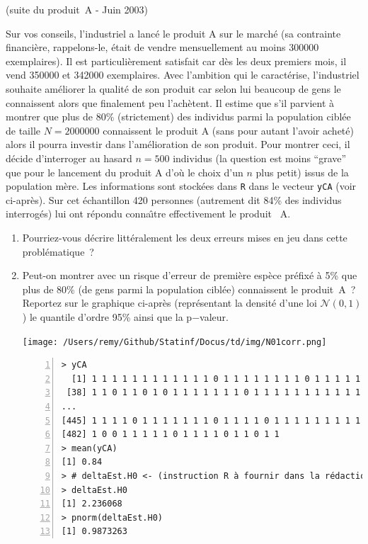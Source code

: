 \documentclass[10pt]{report}
\begin{document}
\begin{exercice} (suite du produit~A - Juin 2003)

Sur vos conseils, l'industriel a lanc{\'e} le produit A sur le march{\'e} (sa contrainte financi{\`e}re, rappelons-le, {\'e}tait de vendre mensuellement au moins 300000 exemplaires). Il est particuli{\`e}rement satisfait car d{\`e}s les deux premiers mois, il vend 350000 et 342000 exemplaires. Avec l'ambition qui le caract{\'e}rise, l'industriel souhaite am{\'e}liorer la qualit{\'e} de son produit car selon lui beaucoup de gens le connaissent alors que finalement peu l'ach{\`e}tent. Il estime que s'il parvient {\`a} montrer que plus de $80\%$ (strictement) des individus parmi la population cibl{\'e}e de taille $N=2000000$ connaissent le produit A (sans pour autant l'avoir achet{\'e}) alors il pourra investir dans l'am{\'e}lioration de son produit. Pour montrer ceci, il d{\'e}cide d'interroger au hasard $n=500$ individus (la question est moins ``grave'' que pour le lancement du produit A d'o{\`u} le choix d'un $n$ plus petit) issus de la population m{\`e}re. Les informations sont stock{\'e}es dans \texttt{R} dans le vecteur \texttt{yCA} (voir ci-apr{\`e}s). Sur cet {\'e}chantillon 420 personnes (autrement dit 84\% des individus interrog{\'e}s) lui ont r{\'e}pondu conna{\^\i}tre effectivement le produit~ A. \\
\begin{enumerate}
\item Pourriez-vous d{\'e}crire litt{\'e}ralement les deux erreurs mises en jeu dans cette probl{\'e}matique~? 



\item Peut-on montrer avec un risque d'erreur de premi{\`e}re esp{\`e}ce pr{\'e}fix{\'e} {\`a} 5\% que plus de 80\% (de gens parmi la population cibl{\'e}e) connaissent le produit~A~? Reportez sur le graphique ci-apr{\`e}s (repr{\'e}sentant la densit{\'e} d'une loi $\mathcal{N}(0,1)$) le quantile d'ordre 95\% ainsi que la p$-$valeur. 
 

\begin{center} 
\texttt{[image: /Users/remy/Github/Statinf/Docus/td/img/N01corr.png]}
\end{center}

\IndicR
\begin{Verbatim}[frame=leftline,fontfamily=tt,fontshape=n,numbers=left]
> yCA
  [1] 1 1 1 1 1 1 1 1 1 1 1 1 0 1 1 1 1 1 1 1 1 0 1 1 1 1 1 1 1 0 1 1 1 1 1 1 1
 [38] 1 1 0 1 1 0 1 0 1 1 1 1 1 1 1 0 1 1 1 1 1 1 1 1 1 1 1 1 1 1 1 1 1 1 1 1 0
...
[445] 1 1 1 1 0 1 1 1 1 1 1 1 0 1 1 1 1 0 1 1 1 1 1 1 1 1 1 0 1 1 1 1 1 1 1 1 1
[482] 1 0 0 1 1 1 1 1 0 1 1 1 1 0 1 1 0 1 1
> mean(yCA)
[1] 0.84
> # deltaEst.H0 <- (instruction R à fournir dans la rédaction)
> deltaEst.H0
[1] 2.236068
> pnorm(deltaEst.H0)
[1] 0.9873263
\end{Verbatim}




\end{enumerate}
\end{exercice}
\end{document}
